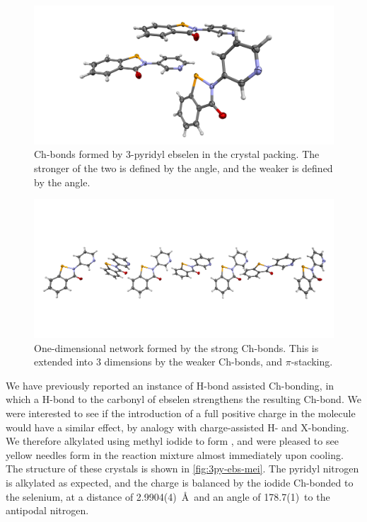 \begin{refsection}
\begin{figure}
    \centering
    \includegraphics[width=\linewidth]{Figures/3py-ebs-chbonds.pdf}
    \caption{Ch-bonds formed by 3-pyridyl ebselen  in the crystal packing. The stronger of the two is defined by the  angle, and the weaker is defined by the  angle.}
    \label{fig:3py-ebs-chbonds}
\end{figure}

\begin{figure}
    \centering
    \includegraphics[width=\linewidth]{Figures/3py-ebs-chain.pdf}
    \caption{One-dimensional network formed by the strong  Ch-bonds. This is extended into 3 dimensions by the weaker  Ch-bonds, and $\pi$-stacking.}
    \label{fig:3py-ebs-chain}
\end{figure}

We have previously reported an instance of H-bond assisted Ch-bonding, in which a H-bond to the carbonyl of ebselen strengthens the resulting Ch-bond.
We were interested to see if the introduction of a full positive charge in the molecule would have a similar effect, by analogy with charge-assisted H- and X-bonding.
We therefore alkylated  using methyl iodide to form , and were pleased to see yellow needles form in the reaction mixture almost immediately upon cooling.
The structure of these crystals is shown in \cref{fig:3py-ebs-mei}.
The pyridyl nitrogen is alkylated as expected, and the charge is balanced by the iodide Ch-bonded to the selenium, at a distance of 2.9904(4)~\AA~and an angle of 178.7(1)\degree~to the antipodal nitrogen.


\end{refsection}
